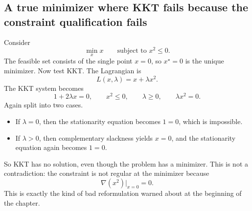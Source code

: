 \subsection{A true minimizer where KKT fails because the constraint qualification fails}
\begin{example}
\label{ex:ch7-regularity-failure}
Consider
\[
  \min_x x
  \qquad \text{subject to } x^2\le 0.
\]
The feasible set consists of the single point $x=0$, so $x^\star=0$ is the
unique minimizer. Now test KKT. The Lagrangian is
\[
  L(x,\lambda)=x+\lambda x^2.
\]
The KKT system becomes
\[
  1+2\lambda x=0,
  \qquad
  x^2\le 0,
  \qquad
  \lambda\ge 0,
  \qquad
  \lambda x^2=0.
\]
Again split into two cases.
\begin{itemize}
  \item If $\lambda=0$, then the stationarity equation becomes $1=0$, which is
  impossible.
  \item If $\lambda>0$, then complementary slackness yields $x=0$, and the
  stationarity equation again becomes $1=0$.
\end{itemize}
So KKT has no solution, even though the problem has a minimizer. This is not a
contradiction: the constraint is not regular at the minimizer because
\[
  \nabla(x^2)\big|_{x=0}=0.
\]
This is exactly the kind of bad reformulation warned about at the beginning of
the chapter.
\end{example}

